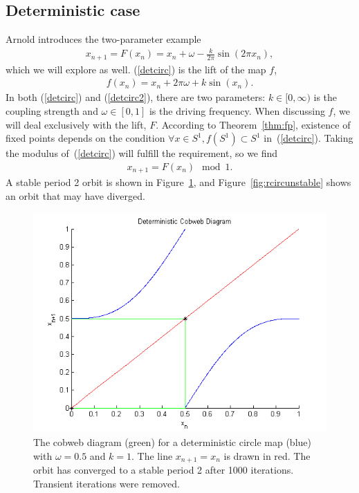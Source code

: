 \subsection{Deterministic case}
Arnold introduces the two-parameter example
\begin{align}\label{detcirc}
x_{n+1}= F(x_n) =  x_n + \omega - \frac{k}{2\pi}\sin(2\pi x_n),
\end{align}
which we will explore as well. (\ref{detcirc}) is the lift of the map
$f$,
\begin{align}\label{detcirc2}
f(x_n) = x_n + 2\pi \omega + k\sin(x_n).
\end{align}
In both (\ref{detcirc}) and (\ref{detcirc2}), there are two parameters: $k \in [0,\infty)$
is the coupling strength and $\omega \in [0,1]$ is the driving
frequency. When discussing $f$, we will deal exclusively with the
lift, $F$. According to Theorem~\ref{thm:fp}, existence of fixed
points depends on the condition $\forall x \in S^1, f(S^1) \subset S^1$
in~(\ref{detcirc}). Taking the modulus of~(\ref{detcirc}) will fulfill
the requirement, so we find
\begin{align*}
x_{n+1}= F(x_n) \mod 1.
\end{align*}
A stable period 2 orbit is shown in
Figure~\ref{fig:dcircstable}, and
Figure~\ref{fig:rcircunstable} shows an orbit that may have diverged.
\begin{figure}[!h]
\caption[Deterministic circle map, stable orbit]{The cobweb
  diagram (green) for a deterministic circle map (blue) with $\omega =
  0.5$ and $k=1$. The line $x_{n+1}=x_n$ is drawn in red. The orbit
  has converged to a stable period 2 after 1000 iterations. Transient iterations were removed.}\label{fig:dcircstable}
	\begin{center}
		\includegraphics[scale=0.7]{figs/detcirc_cobweb_2.png}
	\end{center}
\end{figure}
